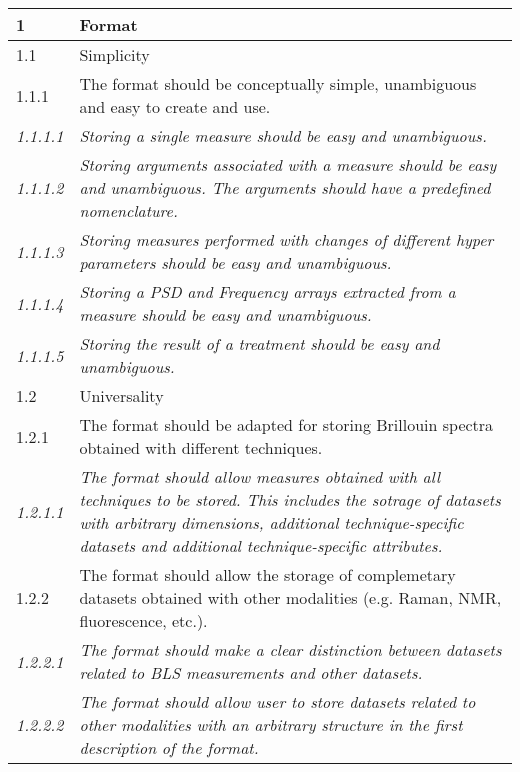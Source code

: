 \renewcommand{\arraystretch}{1.4} %

\begin{tabular}{|p{1cm}|p{14cm}|}
    \hline
    \rowcolor{grayheavy} 1 & Format \\ \hline

    \rowcolor{graylight} 1.1 & Simplicity \\ \hline

    \rowcolor{graysuperlight} 1.1.1 &  The format should be conceptually simple, unambiguous and easy to create and use. \\ \hline
    \textit{1.1.1.1} & \textit{Storing a single measure should be easy and unambiguous.} \\ \hline
    \textit{1.1.1.2} & \textit{Storing arguments associated with a measure should be easy and unambiguous. The arguments should have a predefined nomenclature.} \\ \hline
    \textit{1.1.1.3} & \textit{Storing measures performed with changes of different hyper parameters should be easy and unambiguous.} \\ \hline
    \textit{1.1.1.4} & \textit{Storing a PSD and Frequency arrays extracted from a measure should be easy and unambiguous.} \\ \hline
    \textit{1.1.1.5} & \textit{Storing the result of a treatment should be easy and unambiguous.} \\ \hline

    \rowcolor{graylight} 1.2 & Universality \\ \hline

    \rowcolor{graysuperlight} 1.2.1 &  The format should be adapted for storing Brillouin spectra obtained with different techniques. \\ \hline
    \textit{1.2.1.1} & \textit{The format should allow measures obtained with all techniques to be stored. This includes the sotrage of datasets with arbitrary dimensions, additional technique-specific datasets and additional technique-specific attributes.} \\ \hline

    \rowcolor{graysuperlight} 1.2.2 &  The format should allow the storage of complemetary datasets obtained with other modalities (e.g. Raman, NMR, fluorescence, etc.). \\ \hline
    \textit{1.2.2.1} & \textit{The format should make a clear distinction between datasets related to BLS measurements and other datasets.} \\ \hline
    \textit{1.2.2.2} & \textit{The format should allow user to store datasets related to other modalities with an arbitrary structure in the first description of the format.} \\ \hline


\end{tabular}
